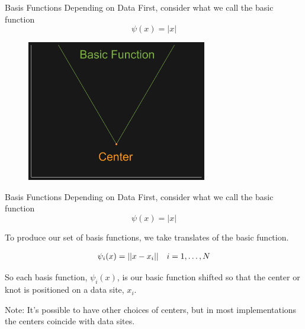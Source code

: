 \documentclass[12pt,t]{beamer}
\newcommand{\subt}[1]{{\footnotesize \color{subtitle} {#1}}}
\begin{document}
\begin{frame}{Basis Functions Depending on Data}
First, consider what we call the \subt{basic function}\\
\begin{equation*}
\psi(x)=|x|
\end{equation*}

\begin{figure}
\includegraphics[width=0.7\textwidth, keepaspectratio]{fig4.png}
\end{figure}

\end{frame}

\begin{frame}{Basis Functions Depending on Data}
First, consider what we call the \subt{basic function}\\
\begin{equation*}
\psi(x)=|x|
\end{equation*}

To produce our set of basis functions, we take \subt{translates} of the basic function.

\begin{align*}
&\psi_i(x)=||x-x_i|| &i=1, \mathellipsis, N
\end{align*}

So each basis function, $\psi_i(x)$, is our basic function shifted so that the \subt{center} or \subt{knot} is positioned on a data site, $x_i$.
\bigskip

\subt{Note:} It's possible to have other choices of centers, but in most implementations the centers coincide with data sites.

\end{frame}
\end{document}
